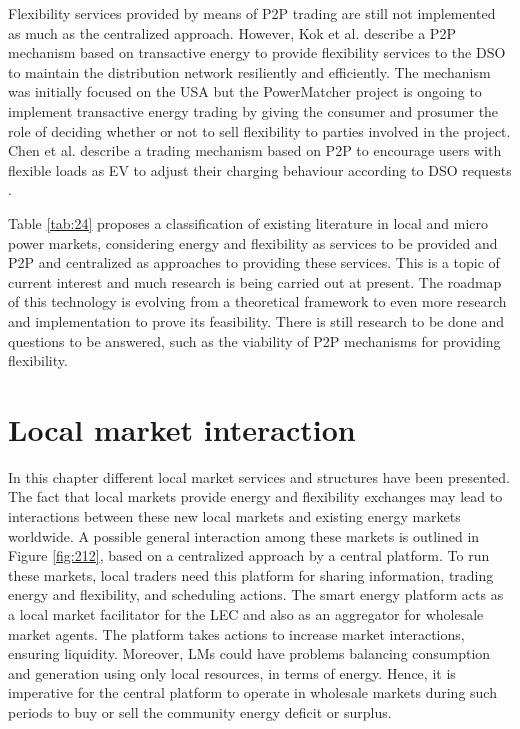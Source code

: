 Flexibility services provided by means of P2P trading are still not implemented as much as the centralized approach. However, Kok et al. \cite{kok2016society} describe a P2P mechanism based on transactive energy to provide flexibility services to the DSO to maintain the distribution network resiliently and efficiently. The mechanism was initially focused on the USA but the PowerMatcher project is ongoing to implement transactive energy trading by giving the consumer and prosumer the role of deciding whether or not to sell flexibility to parties involved in the project. Chen et al. describe a trading mechanism based on P2P to encourage users with flexible loads as EV to adjust their charging behaviour according to DSO requests \cite{chen2017integrated}.

Table \ref{tab:24} proposes a classification of existing literature in local and micro power markets, considering energy and flexibility as services to be provided and P2P and centralized as approaches to providing these services. This is a topic of current interest and much research is being carried out at present. The roadmap of this technology is evolving from a theoretical framework to even more research and implementation to prove its feasibility. There is still research to be done and questions to be answered, such as the viability of P2P mechanisms for providing flexibility.

\section{Local market interaction} \label{sec:interaction}
In this chapter different local market services and structures have been presented. The fact that local markets provide energy and flexibility exchanges may lead to interactions between these new local markets and existing energy markets worldwide. A possible general interaction among these markets is outlined in Figure \ref{fig:212}, based on a centralized approach by a central platform. To run these markets, local traders need this platform for sharing information, trading energy and flexibility, and scheduling actions. The smart energy platform acts as a local market facilitator for the LEC and also as an aggregator for wholesale market agents. The platform takes actions to increase market interactions, ensuring liquidity. Moreover, LMs could have problems balancing consumption and generation using only local resources, in terms of energy. Hence, it is imperative for the central platform to operate in wholesale markets during such periods to buy or sell the community energy deficit or surplus.


